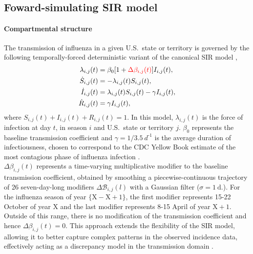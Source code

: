 \documentclass[11pt]{article}
\begin{document}
\subsection*{Foward-simulating SIR model}


\paragraph{Compartmental structure} The transmission of influenza in a given U.S.\ state or territory is governed by the following temporally-forced deterministic variant of the canonical SIR model \citep{keeling2008},
\begin{align}
    \lambda_{i,j}(t) &= \beta_0 [1 + \textcolor{red}{\Delta \beta_{i,j}(t)}]  I_{i,j}(t), \nonumber \\
    \dot{S}_{i,j}(t) &= - \lambda_{i,j}(t) S_{i,j}(t), \nonumber \\ 
    \dot{I}_{i,j}(t) &= \lambda_{i,j}(t) S_{i,j}(t) - \gamma I_{i,j}(t), \nonumber \\
    \dot{R}_{i,j}(t) &= \gamma I_{i,j}(t),
    \label{eq:ODE_simulation}
\end{align}
where $S_{i,j}(t) + I_{i,j}(t) + R_{i,j}(t) = 1$. In this model, $\lambda_{i,j}(t)$ is the force of infection at day $t$, in season $i$ and U.S.\ state or territory $j$. $\beta_0$ represents the baseline transmission coefficient and $\gamma=1/3.5~d^{\text{-}1}$ is the average duration of infectiousness, chosen to correspond to the CDC Yellow Book estimate of the most contagious phase of influenza infection \citep{CDCyellowbook}.\\

$\Delta \beta_{i,j}(t)$ represents a time-varying multiplicative modifier to the baseline transmission coefficient, obtained by smoothing a piecewise-continuous trajectory of 26 seven-day-long modifiers $\Delta \mathcal{B}_{i,j}(l)$ with a Gaussian filter ($\sigma = 1~\text{d.}$). For the influenza season of year $\{\text{X}-\text{X}+1\}$, the first modifier represents 15-22 October of year $\text{X}$ and the last modifier represents 8-15 April of year $\text{X}+1$. Outside of this range, there is no modification of the transmission coefficient and hence $\Delta \beta_{i,j}(t)=0$. This approach extends the flexibility of the SIR model, allowing it to better capture complex patterns in the observed incidence data, effectively acting as a discrepancy model in the transmission domain \citep{osthus2019}.
\end{document}
